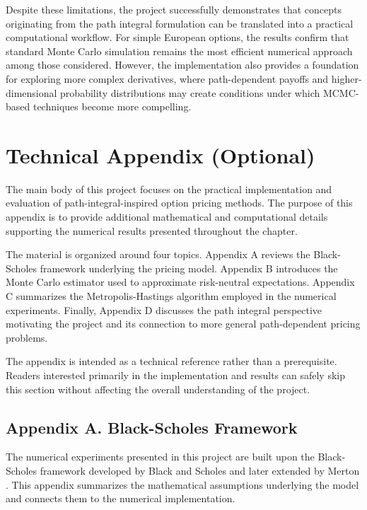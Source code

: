 \documentclass[
  12pt,
  letterpaper,
]{book}
\begin{document}
Despite these limitations, the project successfully demonstrates that
concepts originating from the path integral formulation can be
translated into a practical computational workflow. For simple European
options, the results confirm that standard Monte Carlo simulation
remains the most efficient numerical approach among those considered.
However, the implementation also provides a foundation for exploring
more complex derivatives, where path-dependent payoffs and
higher-dimensional probability distributions may create conditions under
which MCMC-based techniques become more compelling.

\section{Technical Appendix
(Optional)}\label{technical-appendix-optional-2}

The main body of this project focuses on the practical implementation
and evaluation of path-integral-inspired option pricing methods. The
purpose of this appendix is to provide additional mathematical and
computational details supporting the numerical results presented
throughout the chapter.

The material is organized around four topics. Appendix A reviews the
Black-Scholes framework underlying the pricing model. Appendix B
introduces the Monte Carlo estimator used to approximate risk-neutral
expectations. Appendix C summarizes the Metropolis-Hastings algorithm
employed in the numerical experiments. Finally, Appendix D discusses the
path integral perspective motivating the project and its connection to
more general path-dependent pricing problems.

The appendix is intended as a technical reference rather than a
prerequisite. Readers interested primarily in the implementation and
results can safely skip this section without affecting the overall
understanding of the project.

\subsection{Appendix A. Black-Scholes
Framework}\label{appendix-a.-black-scholes-framework}

The numerical experiments presented in this project are built upon the
Black-Scholes framework developed by Black and Scholes and later
extended by Merton 
. This appendix summarizes the
mathematical assumptions underlying the model and connects them to the
numerical implementation.
\end{document}
